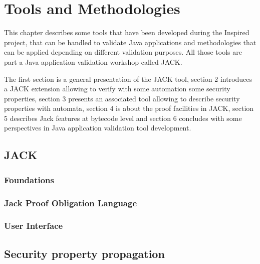 \chapter{Tools and Methodologies}
This chapter describes some tools that have been developed during the Inspired project, that can be handled to validate Java applications and methodologies that can be applied depending on different validation purposes.
All those tools are part a Java application validation workshop called JACK.

The first section is a general presentation of the JACK tool, section 2 introduces a JACK extension allowing to verify with some automation some security properties, section 3 presents an associated tool allowing to describe security properties with automata, section 4 is about the proof facilities in JACK, section 5 describes Jack features at bytecode level and section 6 concludes with some perspectives in Java application validation tool development.
\section{JACK}

\subsection{Foundations}

\subsection{Jack Proof Obligation Language}

\subsection{User Interface}

%
%

\section{Security property propagation}\label{sec:highlevel}



